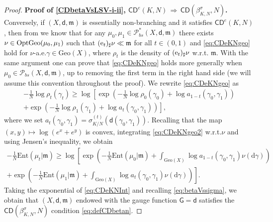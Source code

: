 \documentclass[11pt,a4paper]{article}
\theoremstyle{plain}
\theoremstyle{definition}
\theoremstyle{remark}
\numberwithin{equation}{section}
\newcommand{\CD}{\mathsf{CD}}
\newcommand{\Geo}{\mathrm{Geo}}
\newcommand{\OptGeo}{{\rm OptGeo}}
\newcommand{\Ent}{\mathrm{Ent}}
\newcommand{\Prob}{\mathcal{P}}
\newcommand{\di}{\mathrm{d}}
\newcommand{\mm}{\mathfrak m}
\newcommand{\ee}{{\rm e}}
\newcommand{\sfd}{\mathsf d}
\newcommand{\sfG}{\mathsf G}
\begin{document}
\begin{proof}
\textbf{Proof of \ref{CDbetaVsLSV-i-ii}, $\CD^{e}(K,N) \, \Rightarrow\, \CD (\beta_{K,N}^{\sigma}, N)$.}
Conversely, if $(X,\sfd,\mm)$ is essentially non-branching and it satisfies $\CD^{e}(K,N)$, then from \cite[Thm.\@ 3.12, (iii) $\Rightarrow$ (ii)]{EKS} we know that for any $\mu_0,\mu_{1} \in \Prob_{bs}^{*}(X,\sfd,\mm)$ there exists  $\nu\in \OptGeo(\mu_{0}, \mu_{1})$ such that $(\ee_{t})_{\sharp} \nu\ll \mm$ for all $t\in (0,1)$ and  \eqref{eq:CDeKNgeo} hold for $\nu$-a.e.\@ $\gamma\in \Geo(X)$, where $\rho_{t}$ is the density of $(\ee_{t})_{\sharp}\nu$ w.r.t. $\mm$. With the same argument one can prove that \eqref{eq:CDeKNgeo} holds more generally when $\mu_0\in \mathcal{P}_{bs}(X,\sfd,\mm)$, up to removing the first term in the right hand side (we will assume this convention throughout the proof).
We rewrite \eqref{eq:CDeKNgeo} as
\begin{multline}
-\frac{1}{N}\log \rho_{t}(\gamma_{t})  \geq \log\left[ \exp\left(-\frac{1}{N} \log \rho_{0}(\gamma_{0}) + \log a_{1-t}(\gamma_{0}, \gamma_{1}) \right) \right. 
\\
\left. + \exp\left(-\frac{1}{N} \log \rho_{1}(\gamma_{1}) + \log a_{t}(\gamma_{0}, \gamma_{1})\right)  \right],
   \label{eq:CDeKNgeo2}
\end{multline}
where we set $a_{t}(\gamma_{0}, \gamma_{1})= \sigma_{K/N}^{(t)} (\sfd(\gamma_{0}, \gamma_{1}))$. Recalling that the map $(x,y)\mapsto \log(e^{x}+e^{y})$ is convex, integrating \eqref{eq:CDeKNgeo2} w.r.t.\@ $\nu$ and using Jensen's inequality, we obtain
\begin{multline}\label{eq:CDeKNInt}
-\frac{1}{N}\Ent(\mu_{t}|\mm) \geq \log\left[\exp\left(-\frac{1}{N} \Ent(\mu_{0}|\mm) +\int_{\Geo(X)} \log a_{1-t}(\gamma_{0}, \gamma_{1}) \nu(\di\gamma) \right) \right.
\\
\left. + \exp\left(-\frac{1}{N} \Ent(\mu_{1}|\mm) +\int_{\Geo(X)} \log a_{t}(\gamma_{0}, \gamma_{1})  \nu(\di\gamma)  \right) \right].
\end{multline}
Taking the exponential of \eqref{eq:CDeKNInt} and recalling \eqref{eq:betaVssigma}, we obtain that $(X,\sfd,\mm)$ endowed with the gauge function $\sfG=\sfd$ satisfies the $\CD(\beta_{K,N}^{\sigma}, N)$ condition \eqref{eq:defCDbetan}.


\end{proof}
\end{document}
